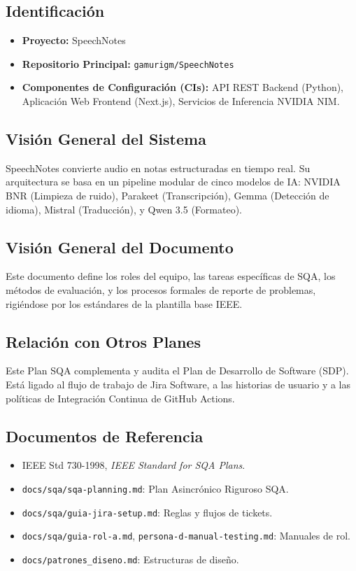 \documentclass[12pt,a4paper]{article}
\begin{document}
\subsection{Identificación}
\begin{itemize}
    \item \textbf{Proyecto:} SpeechNotes
    \item \textbf{Repositorio Principal:} \texttt{gamurigm/SpeechNotes}
    \item \textbf{Componentes de Configuración (CIs):} API REST Backend (Python), Aplicación Web Frontend (Next.js), Servicios de Inferencia NVIDIA NIM.
\end{itemize}

\subsection{Visión General del Sistema}
SpeechNotes convierte audio en notas estructuradas en tiempo real. Su arquitectura se basa en un pipeline modular de cinco modelos de IA: NVIDIA BNR (Limpieza de ruido), Parakeet (Transcripción), Gemma (Detección de idioma), Mistral (Traducción), y Qwen 3.5 (Formateo).

\subsection{Visión General del Documento}
Este documento define los roles del equipo, las tareas específicas de SQA, los métodos de evaluación, y los procesos formales de reporte de problemas, rigiéndose por los estándares de la plantilla base IEEE.

\subsection{Relación con Otros Planes}
Este Plan SQA complementa y audita el Plan de Desarrollo de Software (SDP). Está ligado al flujo de trabajo de Jira Software, a las historias de usuario y a las políticas de Integración Continua de GitHub Actions.

\subsection{Documentos de Referencia}
\begin{itemize}
    \item IEEE Std 730-1998, \textit{IEEE Standard for SQA Plans}.
    \item \texttt{docs/sqa/sqa-planning.md}: Plan Asincrónico Riguroso SQA.
    \item \texttt{docs/sqa/guia-jira-setup.md}: Reglas y flujos de tickets.
    \item \texttt{docs/sqa/guia-rol-a.md}, \texttt{persona-d-manual-testing.md}: Manuales de rol.
    \item \texttt{docs/patrones\_diseno.md}: Estructuras de diseño.
\end{itemize}
\end{document}
